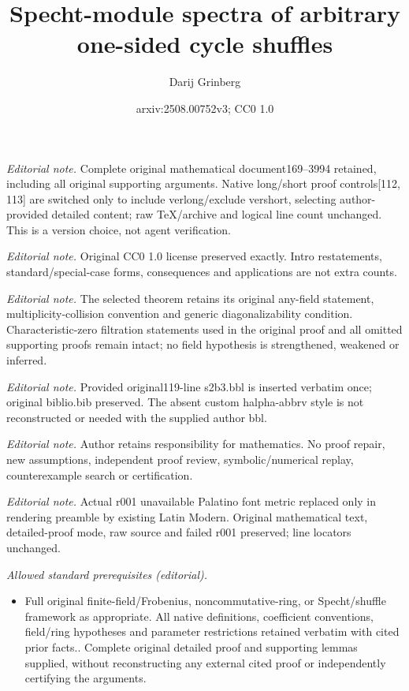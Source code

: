 \documentclass[numbers=enddot,12pt,final,onecolumn,notitlepage]{scrartcl}%
\title{Specht-module spectra of arbitrary one-sided cycle shuffles}
\author{Darij Grinberg}
\date{arxiv:2508.00752v3; CC0 1.0}
\theoremstyle{definition}
\begin{document}
\maketitle
\noindent\textit{Editorial note.} Complete original mathematical document169--3994 retained, including all original supporting arguments. Native long/short proof controls[112, 113] are switched only to include verlong/exclude vershort, selecting author-provided detailed content; raw TeX/archive and logical line count unchanged. This is a version choice, not agent verification.\par\medskip
\noindent\textit{Editorial note.} Original CC0 1.0 license preserved exactly. Intro restatements, standard/special-case forms, consequences and applications are not extra counts.\par\medskip
\noindent\textit{Editorial note.} The selected theorem retains its original any-field statement, multiplicity-collision convention and generic diagonalizability condition. Characteristic-zero filtration statements used in the original proof and all omitted supporting proofs remain intact; no field hypothesis is strengthened, weakened or inferred.\par\medskip
\noindent\textit{Editorial note.} Provided original119-line s2b3.bbl is inserted verbatim once; original biblio.bib preserved. The absent custom halpha-abbrv style is not reconstructed or needed with the supplied author bbl.\par\medskip
\noindent\textit{Editorial note.} Author retains responsibility for mathematics. No proof repair, new assumptions, independent proof review, symbolic/numerical replay, counterexample search or certification.\par\medskip
\noindent\textit{Editorial note.} Actual r001 unavailable Palatino font metric replaced only in rendering preamble by existing Latin Modern. Original mathematical text, detailed-proof mode, raw source and failed r001 preserved; line locators unchanged.\par\medskip
\noindent\textit{Allowed standard prerequisites (editorial).}\begin{itemize}
\item Full original finite-field/Frobenius, noncommutative-ring, or Specht/shuffle framework as appropriate. All native definitions, coefficient conventions, field/ring hypotheses and parameter restrictions retained verbatim with cited prior facts.. Complete original detailed proof and supporting lemmas supplied, without reconstructing any external cited proof or independently certifying the arguments.
\end{itemize}\medskip
\end{document}
